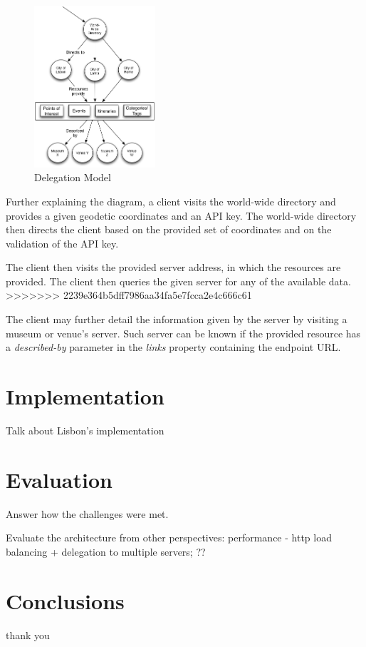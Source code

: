 \documentclass[times]{ettauth}
\begin{document}
\begin{figure}[!ht]
\centering
\includegraphics[width=0.4\textwidth]{images/delegation}
\caption{Delegation Model}
\label{fig:delegation}
\end{figure}

Further explaining the diagram, a client visits the world-wide directory and provides a given geodetic coordinates and an API key. The world-wide directory then directs the client based on the provided set of  coordinates and on the validation of the API key.

The client then visits the provided server address, in which the resources are provided. The client then queries the given server for any of the available data. 
>>>>>>> 2239e364b5dff7986aa34fa5e7fcca2e4c666c61

The client may further detail the information given by the server by visiting a museum or venue's server. Such server can be known if the provided resource has a \textit{described-by} parameter in the \textit{links} property containing the endpoint URL.

\section{Implementation}
Talk about Lisbon's implementation



\section{Evaluation}
Answer how the challenges were met.

Evaluate the architecture from other perspectives: performance - http load balancing + delegation to multiple servers; ??



\section{Conclusions}


\acks
thank you



\end{document}
